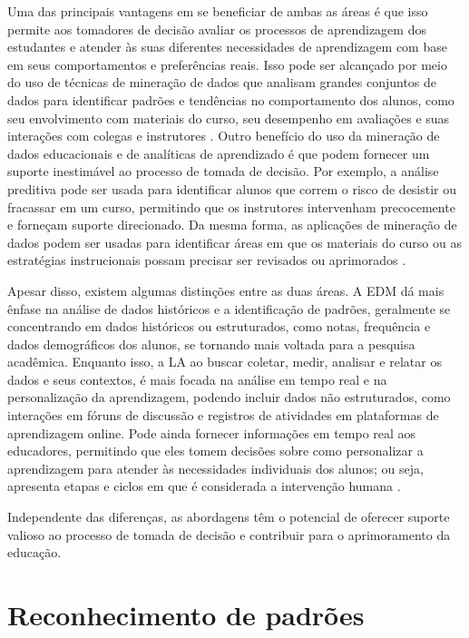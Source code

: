 Uma das principais vantagens em se beneficiar de ambas as áreas é que isso permite aos tomadores de decisão avaliar os processos de aprendizagem dos estudantes e atender às suas diferentes necessidades de aprendizagem com base em seus comportamentos e preferências reais. Isso pode ser alcançado por meio do uso de técnicas de mineração de dados que analisam grandes conjuntos de dados para identificar padrões e tendências no comportamento dos alunos, como seu envolvimento com materiais do curso, seu desempenho em avaliações e suas interações com colegas e instrutores \cite{Cerezo2016}. Outro benefício do uso da mineração de dados educacionais e de analíticas de aprendizado é que podem fornecer um suporte inestimável ao processo de tomada de decisão. Por exemplo, a análise preditiva pode ser usada para identificar alunos que correm o risco de desistir ou fracassar em um curso, permitindo que os instrutores intervenham precocemente e forneçam suporte direcionado. Da mesma forma, as aplicações de mineração de dados podem ser usadas para identificar áreas em que os materiais do curso ou as estratégias instrucionais possam precisar ser revisados ou aprimorados \cite{Aldowah2019}.

{Apesar disso, existem algumas distinções entre as duas áreas. A EDM dá mais ênfase na análise de dados históricos e a identificação de padrões, geralmente se concentrando em dados históricos ou estruturados, como notas, frequência e dados demográficos dos alunos, se tornando mais voltada para a pesquisa acadêmica. Enquanto isso, a LA ao buscar coletar, medir, analisar e relatar os dados e seus contextos, é mais focada na análise em tempo real e na personalização da aprendizagem, podendo incluir dados não estruturados, como interações em fóruns de discussão e registros de atividades em plataformas de aprendizagem online. Pode ainda fornecer informações em tempo real aos educadores, permitindo que eles tomem decisões sobre como personalizar a aprendizagem para atender às necessidades individuais dos alunos; ou seja, apresenta etapas e ciclos em que é considerada a intervenção humana \cite{Campos2021}.}

{Independente das diferenças, as abordagens têm o potencial de oferecer suporte valioso ao processo de tomada de decisão e contribuir para o aprimoramento da educação.}


\section{Reconhecimento de padrões}

